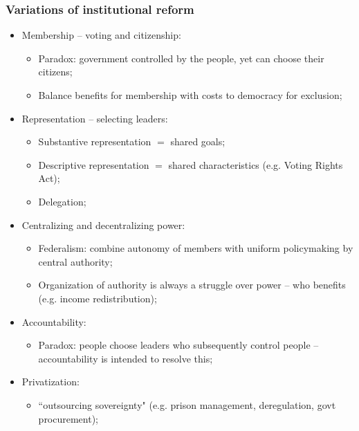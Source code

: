\documentclass[aspectratio=169]{beamer}
\theoremstyle{principle}
\begin{document}
\begin{frame}
\frametitle{Variations of institutional reform}

\begin{itemize}
\item Membership -- voting and citizenship:
\begin{itemize}
\item Paradox: government controlled by the people, yet can choose their citizens;
\item Balance benefits for membership with costs to democracy for exclusion;
\end{itemize}
\item Representation -- selecting leaders:
\begin{itemize}
\item Substantive representation $=$ shared goals;
\item Descriptive representation $=$ shared characteristics (e.g. Voting Rights Act);
\item Delegation;
\end{itemize}
\item Centralizing and decentralizing power:
\begin{itemize}
\item Federalism: combine autonomy of members with uniform policymaking by central authority;
\item Organization of authority is always a struggle over power -- who benefits (e.g. income redistribution);
\end{itemize}
\item Accountability:
\begin{itemize}
\item Paradox: people choose leaders who subsequently control people -- accountability is intended to resolve this;
\end{itemize}
\item Privatization:
\begin{itemize}
\item ``outsourcing sovereignty" (e.g. prison management, deregulation, govt procurement);
\end{itemize}
\end{itemize}

\end{frame}
\end{document}
